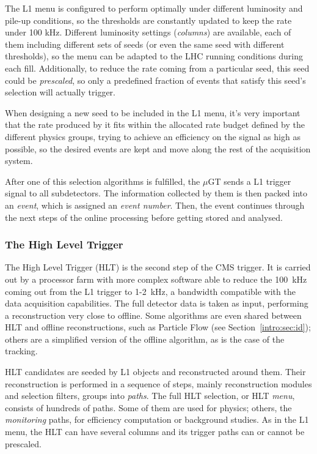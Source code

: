 \documentclass[../main.tex]{subfiles}
\begin{document}
The L1 menu is configured to perform optimally under different luminosity and pile-up conditions, so the thresholds are constantly updated to keep the rate under 100 kHz. Different luminosity settings (\textit{columns}) are available, each of them including different sets of seeds (or even the same seed with different thresholds), so the menu can be adapted to the LHC running conditions during each fill. Additionally, to reduce the rate coming from a particular seed, this seed could be \textit{prescaled}, so only a predefined fraction of events that satisfy this seed's selection will actually trigger.

When designing a new seed to be included in the L1 menu, it's very important that the rate produced by it fits within the allocated rate budget defined by the different physics groups, trying to achieve an efficiency on the signal as high as possible, so the desired events are kept and move along the rest of the acquisition system.

After one of this selection algorithms is fulfilled, the $\mu$GT sends a L1 trigger signal to all subdetectors. The information collected by them is then packed into an \textit{event}, which is assigned an \textit{event number}. Then, the event continues through the next steps of the online processing before getting stored and analysed.

\subsubsection{The High Level Trigger}

The High Level Trigger (HLT) is the second step of the CMS trigger. It is carried out by a processor farm with more complex software able to reduce the 100~kHz coming out from the L1 trigger to 1-2~kHz, a bandwidth compatible with the data acquisition capabilities. The full detector data is taken as input, performing a reconstruction very close to offline. Some algorithms are even shared between HLT and offline reconstructions, such as Particle Flow (see Section~\ref{intro:sec:id}); others are a simplified version of the offline algorithm, as is the case of the tracking.

HLT candidates are seeded by L1 objects and reconstructed around them. Their reconstruction is performed in a sequence of steps, mainly reconstruction modules and selection filters, groups into \textit{paths}. The full HLT selection, or HLT \textit{menu}, consists of hundreds of paths. Some of them are used for physics; others, the \textit{monitoring} paths, for efficiency computation or background studies. As in the L1 menu, the HLT can have several columns and its trigger paths can or cannot be prescaled.
\end{document}
